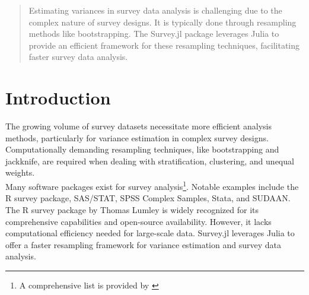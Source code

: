 \documentclass{juliacon}
\begin{document}


\maketitle

\begin{abstract}

Estimating variances in survey data analysis is challenging due to the complex nature of survey designs. It is typically done through resampling methods like bootstrapping. The Survey.jl package leverages Julia to provide an efficient framework for these resampling techniques, facilitating faster survey data analysis.

\end{abstract}

\section{Introduction}

The growing volume of survey datasets necessitate more efficient analysis methods, particularly for variance estimation in complex survey designs. Computationally demanding resampling techniques, like bootstrapping and jackknife, are required when dealing with stratification, clustering, and unequal weights. 
\\

Many software packages exist for survey analysis\footnote{A comprehensive list is provided by \cite{SummarySurveyAnalysis}}. Notable examples include the R survey package, SAS/STAT, SPSS Complex Samples, Stata, and SUDAAN. The R survey package by Thomas Lumley\cite{lumley2004analysis} is widely recognized for its comprehensive capabilities and open-source availability. However, it lacks computational efficiency needed for large-scale data. Survey.jl leverages Julia to offer a faster resampling framework for variance estimation and survey data analysis.




\end{document}
